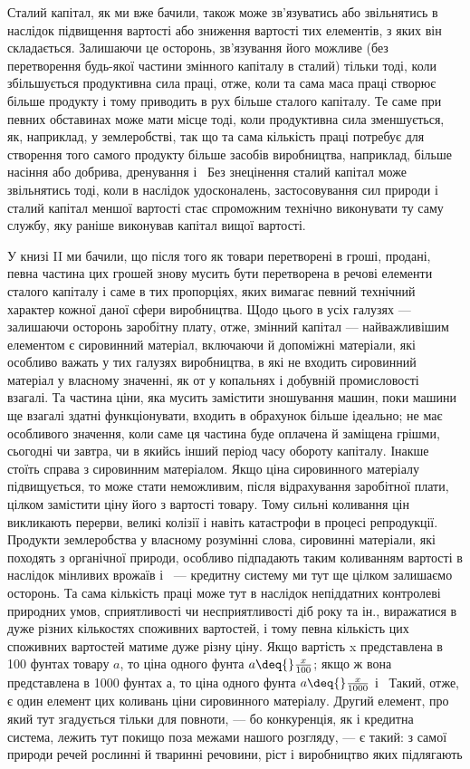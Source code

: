Сталий капітал, як ми вже бачили, також може зв’язуватись
або звільнятись в наслідок підвищення вартості або зниження
вартості тих елементів, з яких він складається. Залишаючи це
осторонь, зв’язування його можливе (без перетворення будь-якої
частини змінного капіталу в сталий) тільки тоді, коли збільшується
продуктивна сила праці, отже, коли та сама маса праці
створює більше продукту і тому приводить в рух більше сталого капіталу. Те саме при певних
обставинах може мати місце
тоді, коли продуктивна сила зменшується, як, наприклад, у землеробстві, так що та сама кількість
праці потребує для створення
того самого продукту більше засобів виробництва, наприклад,
більше насіння або добрива, дренування і~ Без знецінення
сталий капітал може звільнятись тоді, коли в наслідок удосконалень, застосовування сил природи і~ сталий капітал меншої вартості стає спроможним технічно виконувати ту саму службу, яку раніше
виконував капітал вищої вартості.

У книзі II ми бачили, що після того як товари перетворені
в гроші, продані, певна частина цих грошей знову мусить бути
перетворена в речові елементи сталого капіталу і саме в тих
пропорціях, яких вимагає певний технічний характер кожної
даної сфери виробництва. Щодо цього в усіх галузях — залишаючи осторонь заробітну плату, отже,
змінний капітал — найважливішим елементом є сировинний матеріал, включаючи й допоміжні матеріали,
які особливо важать у тих галузях виробництва, в які не входить сировинний матеріал у власному
значенні, як от у копальнях і добувній промисловості взагалі. Та частина ціни, яка мусить замістити
зношування машин, поки
машини ще взагалі здатні функціонувати, входить в обрахунок
більше ідеально; не має особливого значення, коли саме ця
частина буде оплачена й заміщена грішми, сьогодні чи завтра,
чи в якийсь інший період часу обороту капіталу. Інакше стоїть
справа з сировинним матеріалом. Якщо ціна сировинного матеріалу підвищується, то може стати
неможливим, після відрахування заробітної плати, цілком замістити ціну його з вартості товару. Тому
сильні коливання цін викликають перерви, великі
колізії і навіть катастрофи в процесі репродукції. Продукти
землеробства у власному розумінні слова, сировинні матеріали,
які походять з органічної природи, особливо підпадають таким
коливанням вартості в наслідок мінливих врожаїв і~ — кредитну систему ми тут ще цілком
залишаємо осторонь. Та сама
кількість праці може тут в наслідок непіддатних контролеві природних умов, сприятливості чи
несприятливості діб року та ін.,
виражатися в дуже різних кількостях споживних вартостей,
і тому певна кількість цих споживних вартостей матиме дуже
різну ціну. Якщо вартість x представлена в 100 фунтах товару $a$, то ціна одного фунта $a \deq{} \frac{x}{100}$; якщо
ж вона представлена в 1000 фунтах $а$, то ціна одного фунта $a \deq{} \frac{x}{1000}$ і~ Такий, отже, є один
елемент цих коливань ціни сировинного матеріалу.
Другий елемент, про який тут згадується тільки для повноти, — бо конкуренція, як і кредитна система,
лежить тут покищо поза
межами нашого розгляду, — є такий: з самої природи речей
рослинні й тваринні речовини, ріст і виробництво яких підлягають
\parbreak{}  %
